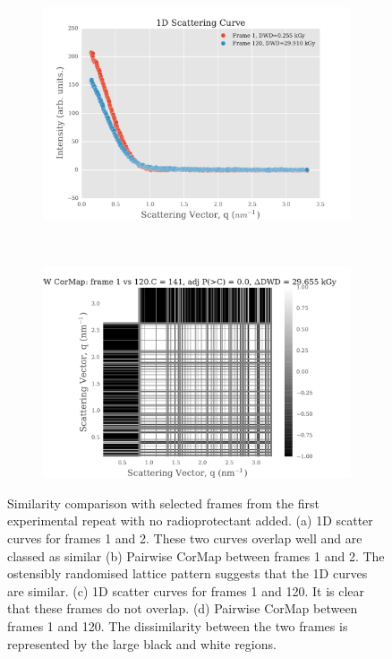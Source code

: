 \begin{figure}
    \ContinuedFloat
    \begin{subfigure}[b]{0.9\textwidth}
            \centering
            \includegraphics[width=\textwidth]{figures/saxs/scatter_curve_frames_1_120.pdf}
            \caption{}
            \label{fig:1D scatter plot of frames 1 and 120}
    \end{subfigure}
    \\
    \begin{subfigure}[b]{0.9\textwidth}
            \centering
            \includegraphics[width=\textwidth]{figures/saxs/pwcormap_frames_1_120.pdf}
            \caption{}
            \label{fig:Pairwise correlation frames 1 and 120}
    \end{subfigure}
    \caption[Similarity comparison with selected frames from the first experimental repeat with no radioprotectant added]{Similarity comparison with selected frames from the first experimental repeat with no radioprotectant added. (a) 1D scatter curves for frames 1 and 2. These two curves overlap well and are classed as similar (b) Pairwise CorMap between frames 1 and 2. The ostensibly randomised lattice pattern suggests that the 1D curves are similar. (c) 1D scatter curves for frames 1 and 120. It is clear that these frames do not overlap. (d) Pairwise CorMap between frames 1 and 120. The dissimilarity between the two frames is represented by the large black and white regions.}
    \label{fig:Pairwise correlation plots}
\end{figure}

